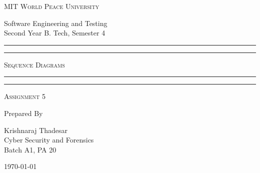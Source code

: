 \documentclass[11pt]{article}
\begin{document}
\begin{titlepage}
	\centering


	\huge\textsc{
		MIT World Peace University
	}\\

	\vspace{0.75\baselineskip} %

	\LARGE{
		Software Engineering and Testing\\
		Second Year B. Tech, Semester 4
	}

	\vfill %


	\rule{\textwidth}{1.6pt}\vspace*{-\baselineskip}\vspace*{2pt}
	\rule{\textwidth}{0.6pt}
	\vspace{0.75\baselineskip} %



	\huge{\textsc{
			Sequence Diagrams
		}} \\



	\vspace{0.5\baselineskip} %
	\rule{\textwidth}{0.6pt}\vspace*{-\baselineskip}\vspace*{2.8pt}
	\rule{\textwidth}{1.6pt}

	\vspace{1\baselineskip} %


	\LARGE\textsc{
		\centering
		Assignment 5
	} %
	\vfill


	Prepared By
	\vspace{0.5\baselineskip} %

	\Large{
		Krishnaraj Thadesar \\
		Cyber Security and Forensics\\
		Batch A1, PA 20
	}


	\vspace{0.5\baselineskip} %
	\today

\end{titlepage}
\end{document}
